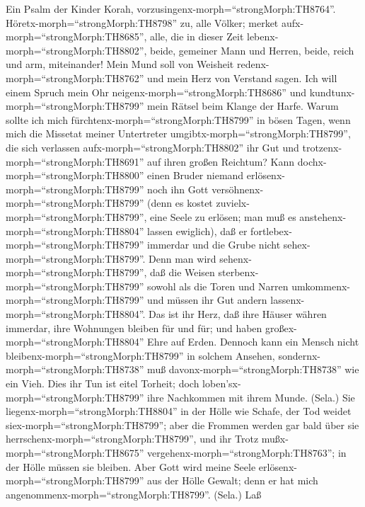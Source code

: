  Ein Psalm der Kinder Korah,
vorzusingenx-morph=``strongMorph:TH8764''.
Höretx-morph=``strongMorph:TH8798'' zu, alle Völker; merket
aufx-morph=``strongMorph:TH8685'', alle, die in dieser Zeit
lebenx-morph=``strongMorph:TH8802'',  beide, gemeiner Mann
und Herren, beide, reich und arm, miteinander!  Mein Mund
soll von Weisheit redenx-morph=``strongMorph:TH8762'' und mein Herz von
Verstand sagen.  Ich will einem Spruch mein Ohr
neigenx-morph=``strongMorph:TH8686'' und
kundtunx-morph=``strongMorph:TH8799'' mein Rätsel beim Klange der Harfe.
 Warum sollte ich mich
fürchtenx-morph=``strongMorph:TH8799'' in bösen Tagen, wenn mich die
Missetat meiner Untertreter umgibtx-morph=``strongMorph:TH8799'',
 die sich verlassen aufx-morph=``strongMorph:TH8802'' ihr
Gut und trotzenx-morph=``strongMorph:TH8691'' auf ihren großen Reichtum?
 Kann dochx-morph=``strongMorph:TH8800'' einen Bruder
niemand erlösenx-morph=``strongMorph:TH8799'' noch ihn Gott
versöhnenx-morph=``strongMorph:TH8799''  (denn es kostet
zuvielx-morph=``strongMorph:TH8799'', eine Seele zu erlösen; man muß es
anstehenx-morph=``strongMorph:TH8804'' lassen ewiglich), 
daß er fortlebex-morph=``strongMorph:TH8799'' immerdar und die Grube
nicht sehex-morph=``strongMorph:TH8799''.  Denn man wird
sehenx-morph=``strongMorph:TH8799'', daß die Weisen
sterbenx-morph=``strongMorph:TH8799'' sowohl als die Toren und Narren
umkommenx-morph=``strongMorph:TH8799'' und müssen ihr Gut andern
lassenx-morph=``strongMorph:TH8804''.  Das ist ihr Herz,
daß ihre Häuser währen immerdar, ihre Wohnungen bleiben für und für; und
haben großex-morph=``strongMorph:TH8804'' Ehre auf Erden. 
Dennoch kann ein Mensch nicht bleibenx-morph=``strongMorph:TH8799'' in
solchem Ansehen, sondernx-morph=``strongMorph:TH8738'' muß
davonx-morph=``strongMorph:TH8738'' wie ein Vieh.  Dies ihr
Tun ist eitel Torheit; doch loben'sx-morph=``strongMorph:TH8799'' ihre
Nachkommen mit ihrem Munde. (Sela.)  Sie
liegenx-morph=``strongMorph:TH8804'' in der Hölle wie Schafe, der Tod
weidet siex-morph=``strongMorph:TH8799''; aber die Frommen werden gar
bald über sie herrschenx-morph=``strongMorph:TH8799'', und ihr Trotz
mußx-morph=``strongMorph:TH8675''
vergehenx-morph=``strongMorph:TH8763''; in der Hölle müssen sie bleiben.
 Aber Gott wird meine Seele
erlösenx-morph=``strongMorph:TH8799'' aus der Hölle Gewalt; denn er hat
mich angenommenx-morph=``strongMorph:TH8799''. (Sela.)  Laß
